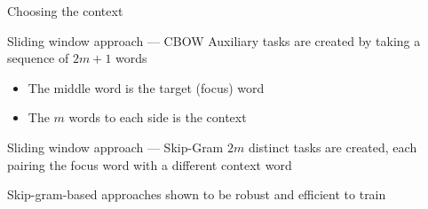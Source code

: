\documentclass[12pt,aspectratio=169,handout]{beamer}
\begin{document}
\begin{frame}{Choosing the context}

\begin{block}{Sliding window approach --- CBOW}
Auxiliary tasks are created by taking a sequence of $2m + 1$ words
\begin{itemize}
	\item The middle word is the target (focus) word
	\item The $m$ words to each side is the context
\end{itemize}
\end{block}

\begin{block}{Sliding window approach --- Skip-Gram}
$2m$ distinct tasks are created, each pairing the focus word with a different context word
\end{block}	

Skip-gram-based approaches shown to be robust and efficient to train

\end{frame}
\end{document}
